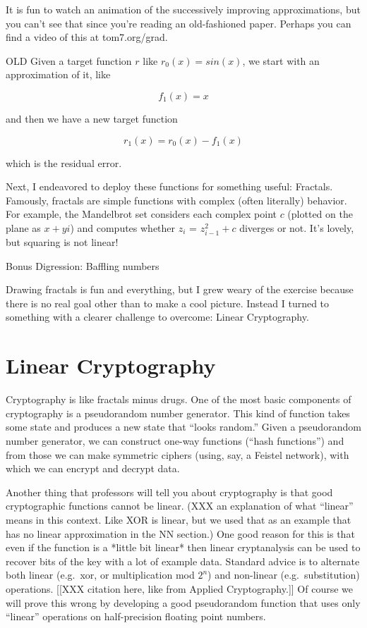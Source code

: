 \documentclass[twocolumn]{article}
\begin{document}
It is fun to watch an animation of the successively improving approximations, but you can't see that since you're reading an old-fashioned paper. Perhaps you can find a video of this at tom7.org/grad.


OLD Given a target function $r$ like $r_0(x) = sin(x)$, we start with an approximation of it, like

$$f_1(x) = x$$

and then we have a new target function

$$r_1(x) = r_0(x) - f_1(x)$$

which is the residual error.


Next, I endeavored to deploy these functions for something useful: Fractals. Famously, fractals are simple functions with complex (often literally) behavior. For example, the Mandelbrot set considers each complex point $c$ (plotted on the plane as $x + yi$) and computes whether $z_i$ = $z_{i-1}^2 + c$ diverges or not. It's lovely, but squaring is not linear!



Bonus Digression: Baffling numbers


Drawing fractals is fun and everything, but I grew weary of the
exercise because there is no real goal other than to make a cool
picture. Instead I turned to something with a clearer challenge to
overcome: Linear Cryptography.

\section{Linear Cryptography}
Cryptography is like fractals minus drugs. One of the most basic
components of cryptography is a pseudorandom number generator. This
kind of function takes some state and produces a new state that
``looks random.'' Given a pseudorandom number generator, we can
construct one-way functions (``hash functions'') and from those we can
make symmetric ciphers (using, say, a Feistel network), with which we
can encrypt and decrypt data.

Another thing that professors will tell you about cryptography is that good cryptographic functions cannot be linear. (XXX an explanation of what ``linear'' means in this context. Like XOR is linear, but we used that as an example that has no linear approximation in the NN section.) One good reason for this is that even if the function is a *little bit linear* then linear cryptanalysis can be used to recover bits of the key with a lot of example data. Standard advice is to alternate both linear (e.g.~xor, or multiplication mod $2^n$) and non-linear (e.g.~substitution) operations. [[XXX citation here, like from Applied Cryptography.]] Of course we will prove this wrong by developing a good pseudorandom function that uses only ``linear'' operations on half-precision floating point numbers.
\end{document}
